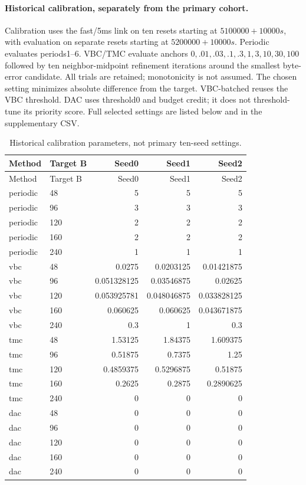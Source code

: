\paragraph{Historical calibration, separately from the primary cohort.} Calibration uses the fast/5ms link on ten resets starting at $5100000+10000s$, with evaluation on separate resets starting at $5200000+10000s$. Periodic evaluates periods1--6. VBC/TMC evaluate anchors $0,.01,.03,.1,.3,1,3,10,30,100$ followed by ten neighbor-midpoint refinement iterations around the smallest byte-error candidate. All trials are retained; monotonicity is not assumed. The chosen setting minimizes absolute difference from the target. VBC-batched reuses the VBC threshold. DAC uses threshold0 and budget credit; it does not threshold-tune its priority score. Full selected settings are listed below and in the supplementary CSV.
\begin{longtable}{llrrr}\caption{Historical calibration parameters, not primary ten-seed settings.}\\\toprule Method & Target B & Seed0 & Seed1 & Seed2\\\midrule\endfirsthead\toprule Method & Target B & Seed0 & Seed1 & Seed2\\\midrule\endhead
periodic & 48 & 5 & 5 & 5\\
periodic & 96 & 3 & 3 & 3\\
periodic & 120 & 2 & 2 & 2\\
periodic & 160 & 2 & 2 & 2\\
periodic & 240 & 1 & 1 & 1\\
vbc & 48 & 0.0275 & 0.0203125 & 0.01421875\\
vbc & 96 & 0.051328125 & 0.03546875 & 0.02625\\
vbc & 120 & 0.053925781 & 0.048046875 & 0.033828125\\
vbc & 160 & 0.060625 & 0.060625 & 0.043671875\\
vbc & 240 & 0.3 & 1 & 0.3\\
tmc & 48 & 1.53125 & 1.84375 & 1.609375\\
tmc & 96 & 0.51875 & 0.7375 & 1.25\\
tmc & 120 & 0.4859375 & 0.5296875 & 0.51875\\
tmc & 160 & 0.2625 & 0.2875 & 0.2890625\\
tmc & 240 & 0 & 0 & 0\\
dac & 48 & 0 & 0 & 0\\
dac & 96 & 0 & 0 & 0\\
dac & 120 & 0 & 0 & 0\\
dac & 160 & 0 & 0 & 0\\
dac & 240 & 0 & 0 & 0\\
\bottomrule\end{longtable}
